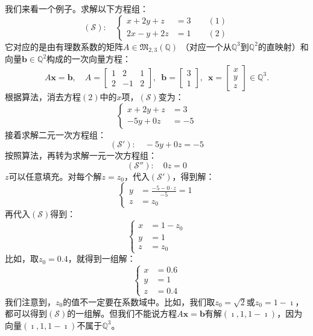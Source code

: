 \documentclass[12pt,UTF8,fontset=none]{ctexbook}
\begin{document}
我们来看一个例子。求解以下方程组：
$$ (\mathcal{S}):\quad \left\{
    \begin{array}{rl}
x + 2y + z &= 3 \quad \quad (1)\\
2x - y + 2z &= 1  \quad \quad (2)
\end{array}
\right. $$
它对应的是由有理数系数的矩阵$A \in \mathfrak{M}_{2,3}(\mathbb{Q})$
（对应一个从$\mathbb{Q}^3$到$\mathbb{Q}^2$的直映射）和向量$\mathbf{b}\in \mathbb{Q}^2$构成的一次向量方程：
$$ A\mathbf{x} = \mathbf{b}, \quad A = \begin{bmatrix}1 & 2 & 1 \\ 2 & -1 & 2\end{bmatrix}, \,\,\, \mathbf{b} = \begin{bmatrix} 3 \\ 1 \end{bmatrix}, \,\,\, \mathbf{x} = \begin{bmatrix} x \\ y \\ z \end{bmatrix} \in \mathbb{Q}^3.$$
根据算法，消去方程$(2)$中的$x$项，$(\mathcal{S})$变为：
$$ \left\{
    \begin{array}{rl}
x + 2y + z &= 3 \\
 - 5y + 0z &= -5  
\end{array}
\right. $$
接着求解二元一次方程组：
$$ (\mathcal{S}'):\quad  - 5y + 0z = -5 $$
按照算法，再转为求解一元一次方程组：
$$ (\mathcal{S}''):\quad  0z = 0 $$
$z$可以任意填充。对每个解$z = z_0$，代入$(\mathcal{S}')$，得到解：
$$ \left\{
    \begin{array}{rl}
y &=\frac{-5 - 0\cdot z}{-5} = 1 \\
 z &= z_0 
\end{array}
\right. $$
再代入$(\mathcal{S})$得到：
$$ \left\{
    \begin{array}{rl}
x &= 1 - z_0 \\
y &= 1 \\
 z &= z_0
\end{array}
\right. $$
比如，取$z_0 = 0.4$，就得到一组解：
$$ \left\{
    \begin{array}{rl}
x &= 0.6  \\
y &= 1 \\
z &= 0.4  
\end{array}
\right. $$
我们注意到，$z_0$的值不一定要在系数域中。比如，我们取$z_0 = \sqrt{2}$或$z_0 = 1 - \imath $，都可以得到$(\mathcal{S})$的一组解。但我们不能说方程$A\mathbf{x} = \mathbf{b}$有解$(\imath , 1, 1 - \imath )$，因为向量$(\imath , 1, 1 - \imath )$不属于$\mathbb{Q}^3$。
\end{document}
